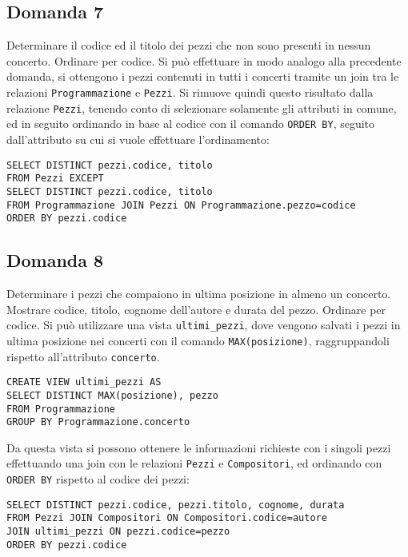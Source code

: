 \documentclass{article}
\numberwithin{equation}{subsection}
\begin{document}
\subsection*{Domanda 7}
Determinare il codice ed il titolo dei pezzi che non sono presenti in nessun concerto. Ordinare per codice. Si può effettuare in modo analogo alla precedente domanda, si ottengono i pezzi contenuti in tutti i 
concerti tramite un join tra le relazioni \verb|Programmazione| e \verb|Pezzi|. Si rimuove quindi questo risultato dalla relazione \verb|Pezzi|, tenendo conto di selezionare solamente gli attributi in comune, ed 
in seguito ordinando in base al codice con il comando \verb|ORDER BY|, seguito dall'attributo su cui si vuole effettuare l'ordinamento: 
\begin{verbatim}
SELECT DISTINCT pezzi.codice, titolo
FROM Pezzi EXCEPT
SELECT DISTINCT pezzi.codice, titolo
FROM Programmazione JOIN Pezzi ON Programmazione.pezzo=codice
ORDER BY pezzi.codice 
\end{verbatim}

\subsection*{Domanda 8}
Determinare i pezzi che compaiono in ultima posizione in almeno un concerto. Mostrare codice, titolo, cognome dell'autore e durata del pezzo. Ordinare per codice. Si può utilizzare una vista \verb|ultimi_pezzi|, 
dove vengono salvati i pezzi in ultima posizione nei concerti con il comando \verb|MAX(posizione)|, raggruppandoli rispetto all'attributo \verb|concerto|. 
\begin{verbatim}
CREATE VIEW ultimi_pezzi AS
SELECT DISTINCT MAX(posizione), pezzo
FROM Programmazione 
GROUP BY Programmazione.concerto
\end{verbatim}
Da questa vista si possono ottenere le informazioni richieste con i singoli pezzi effettuando una join con le relazioni \verb|Pezzi| e \verb|Compositori|, ed ordinando con \verb|ORDER BY| rispetto al codice dei 
pezzi:
\begin{verbatim}
SELECT DISTINCT pezzi.codice, pezzi.titolo, cognome, durata
FROM Pezzi JOIN Compositori ON Compositori.codice=autore
JOIN ultimi_pezzi ON pezzi.codice=pezzo
ORDER BY pezzi.codice
\end{verbatim}
\end{document}
